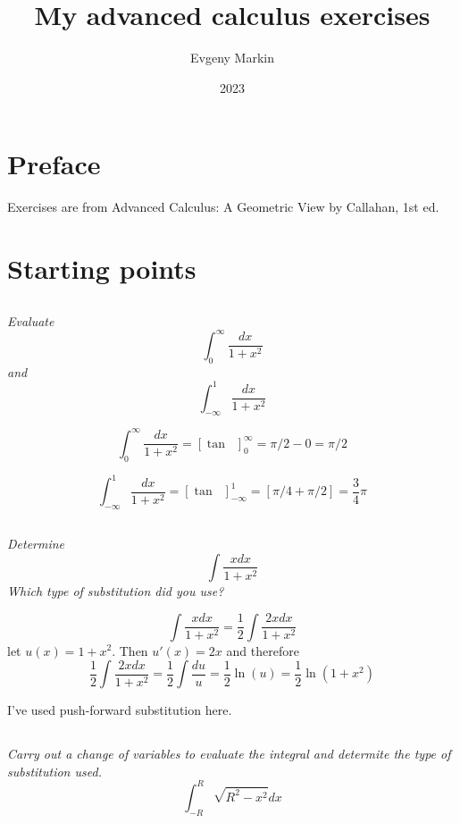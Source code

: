 \documentclass[11pt,oneside,titlepage]{book}
\title{My advanced calculus exercises}
\author{Evgeny Markin}
\date{2023}
\DeclareMathOperator \inv {^{-1}}
\begin{document}
\maketitle
\tableofcontents

\chapter*{Preface}


Exercises are from Advanced Calculus: A Geometric View by Callahan, 1st ed.


\chapter{Starting points}

\section{}

\textit{Evaluate }
$$\int_0^\infty{\frac{dx}{1 + x^2}}$$
\textit{and}
$$\int_{-\infty}^1{\frac{dx}{1 + x^2}}$$

$$\int_0^\infty{\frac{dx}{1 + x^2}} = [\tan \inv]_0^\infty = \pi/2 - 0 = \pi/2 $$

$$\int_{-\infty}^1{\frac{dx}{1 + x^2}} = [\tan \inv]_{-\infty}^1 = [\pi/4 + \pi/2] = \frac{3}{4} \pi$$


\section{}

\textit{Determine}
$$\int{\frac {x dx}{1 + x^2}}$$
\textit{Which type of substitution did you use?}

$$\int{\frac {x dx}{1 + x^2}} = \frac 1 2 \int{ \frac {2 x  dx}{1 + x^2}}$$
let $u(x) = 1 + x^2$. Then $u'(x) = 2x$ and therefore
$$\frac 1 2 \int{ \frac {2 x  dx}{1 + x^2}} =
\frac 1 2 \int{ \frac {du}{u}} = \frac{1}{2} \ln(u) = \frac{1}{2} \ln(1 + x^2)$$

I've used push-forward substitution here.

\section{}

\textit{Carry out a change of variables to evaluate the integral and determite the type
of substitution used.}
$$\int_{-R}^{R}{\sqrt{R^2 - x^2}dx}$$
\end{document}
